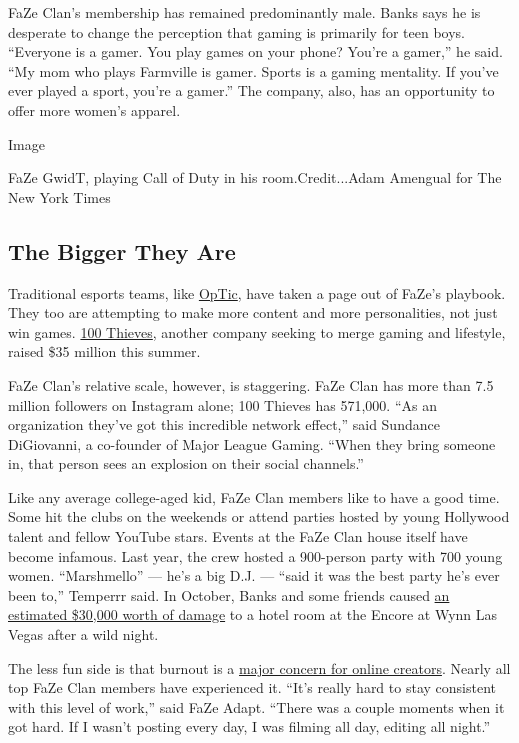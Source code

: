 FaZe Clan's membership has remained predominantly male. Banks says he is
desperate to change the perception that gaming is primarily for teen
boys. ``Everyone is a gamer. You play games on your phone? You're a
gamer,'' he said. ``My mom who plays Farmville is gamer. Sports is a
gaming mentality. If you've ever played a sport, you're a gamer.'' The
company, also, has an opportunity to offer more women's apparel.

Image

FaZe GwidT, playing Call of Duty in his room.Credit...Adam Amengual for
The New York Times

\hypertarget{the-bigger-they-are}{%
\subsection{The Bigger They Are}\label{the-bigger-they-are}}

Traditional esports teams, like
\href{https://www.youtube.com/user/OpTicNation}{OpTic}, have taken a
page out of FaZe's playbook. They too are attempting to make more
content and more personalities, not just win games.
\href{https://www.nytimes3xbfgragh.onion/2019/04/25/style/video-game-esports-apparel-clothes.html}{100
Thieves}, another company seeking to merge gaming and lifestyle, raised
\$35 million this summer.

FaZe Clan's relative scale, however, is staggering. FaZe Clan has more
than 7.5 million followers on Instagram alone; 100 Thieves has 571,000.
``As an organization they've got this incredible network effect,'' said
Sundance DiGiovanni, a co-founder of Major League Gaming. ``When they
bring someone in, that person sees an explosion on their social
channels.''

Like any average college-aged kid, FaZe Clan members like to have a good
time. Some hit the clubs on the weekends or attend parties hosted by
young Hollywood talent and fellow YouTube stars. Events at the FaZe Clan
house itself have become infamous. Last year, the crew hosted a
900-person party with 700 young women. ``Marshmello'' --- he's a big
D.J. --- ``said it was the best party he's ever been to,'' Temperrr
said. In October, Banks and some friends caused
\href{https://www.tmz.com/2019/10/31/faze-banks-las-vegas-hotel-room-destruction-video/}{an
estimated \$30,000 worth of damage} to a hotel room at the Encore at
Wynn Las Vegas after a wild night.

The less fun side is that burnout is a
\href{https://www.polygon.com/2018/6/1/17413542/burnout-mental-health-awareness-youtube-elle-mills-el-rubius-bobby-burns-pewdiepie}{major
concern for online creators}. Nearly all top FaZe Clan members have
experienced it. ``It's really hard to stay consistent with this level of
work,'' said FaZe Adapt. ``There was a couple moments when it got hard.
If I wasn't posting every day, I was filming all day, editing all
night.''


